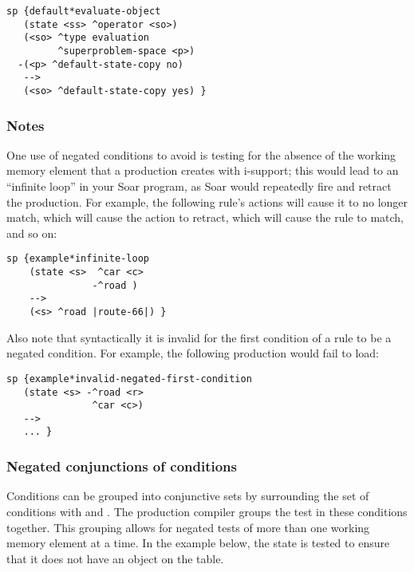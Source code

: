 \begin{verbatim}
sp {default*evaluate-object
   (state <ss> ^operator <so>)
   (<so> ^type evaluation
         ^superproblem-space <p>)
  -(<p> ^default-state-copy no)
   -->
   (<so> ^default-state-copy yes) }
\end{verbatim}

\subsubsection*{Notes}

One use of negated conditions to avoid is testing for the absence of the working memory element that a production creates with i-support; this would lead to an ``infinite loop'' in your Soar program, as Soar would repeatedly fire and retract the production. For example, the following rule's actions will cause it to no longer match, which will cause the action to retract, which will cause the rule to match, and so on:

\begin{verbatim}
sp {example*infinite-loop
    (state <s>  ^car <c>
               -^road )
    -->
    (<s> ^road |route-66|) }
\end{verbatim}

Also note that syntactically it is invalid for the first condition of a rule to be a negated condition. For example, the following production would fail to load:

\begin{verbatim}
sp {example*invalid-negated-first-condition
   (state <s> -^road <r>
               ^car <c>)
   -->
   ... }
\end{verbatim}

\subsubsection{Negated conjunctions of conditions}
\label{SYNTAX-pm-lhs-negaconj}      %

Conditions can be grouped into conjunctive sets by surrounding the set of conditions with \soar{\{} and \soar{\}}. The production compiler groups the test in these conditions together. This grouping allows for negated tests of more than one working memory element at a time. In the example below, the state is tested to ensure that it does not have an object on the table.


